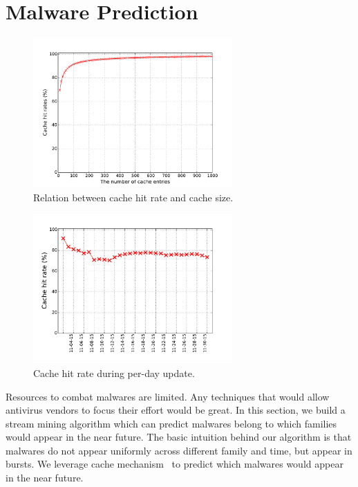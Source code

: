 \section{Malware Prediction}
\label{sec:predict}

\begin{figure}[t!]
\begin{center}
\includegraphics[width=3.0in]{figure/LRU}
\caption{Relation between cache hit rate and cache size.}
\label{fig:cache}
\end{center}
\end{figure}


\begin{figure}[t!]
\begin{center}
\includegraphics[width=3.0in]{figure/LRU_day}
\caption{Cache hit rate during per-day update.}
\label{fig:batchcache}
\end{center}
\end{figure}

Resources to combat malwares are limited. 
Any techniques that would allow antivirus vendors to focus their effort would be great. 
In this section, we build a stream mining algorithm which can predict malwares belong to which families would appear in the near future. 
The basic intuition behind our algorithm is that malwares do not appear uniformly across different family and time, but appear in bursts. 
We leverage cache mechanism~\cite{predicting} to predict which malwares would appear in the near future. 

